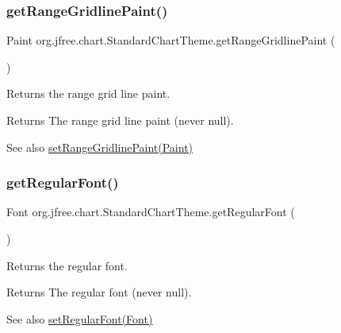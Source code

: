 \subsubsection{\texorpdfstring{get\+Range\+Gridline\+Paint()}{getRangeGridlinePaint()}}
{\footnotesize\ttfamily Paint org.\+jfree.\+chart.\+Standard\+Chart\+Theme.\+get\+Range\+Gridline\+Paint (\begin{DoxyParamCaption}{ }\end{DoxyParamCaption})}

Returns the range grid line paint.

\begin{DoxyReturn}{Returns}
The range grid line paint (never {\ttfamily null}).
\end{DoxyReturn}
\begin{DoxySeeAlso}{See also}
\mbox{\hyperlink{classorg_1_1jfree_1_1chart_1_1_standard_chart_theme_a86328e314e2d0195033b5cae639f141f}{set\+Range\+Gridline\+Paint(\+Paint)}} 
\end{DoxySeeAlso}
\mbox{\label{classorg_1_1jfree_1_1chart_1_1_standard_chart_theme_a588cc2cf8dff888884e79ed24adafeba}} 
\subsubsection{\texorpdfstring{get\+Regular\+Font()}{getRegularFont()}}
{\footnotesize\ttfamily Font org.\+jfree.\+chart.\+Standard\+Chart\+Theme.\+get\+Regular\+Font (\begin{DoxyParamCaption}{ }\end{DoxyParamCaption})}

Returns the regular font.

\begin{DoxyReturn}{Returns}
The regular font (never {\ttfamily null}).
\end{DoxyReturn}
\begin{DoxySeeAlso}{See also}
\mbox{\hyperlink{classorg_1_1jfree_1_1chart_1_1_standard_chart_theme_ae3327471f36e9858487df4e1ef36d9e3}{set\+Regular\+Font(\+Font)}} 
\end{DoxySeeAlso}
\mbox{\label{classorg_1_1jfree_1_1chart_1_1_standard_chart_theme_a7401d8e8d0bfe305ff4297a047ccff3b}} 
